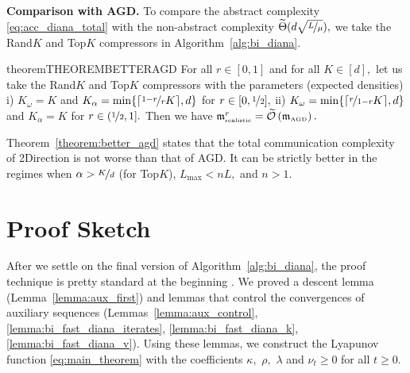 \documentclass{article} %
\newcommand{\cO}{\mathcal{O}}
\theoremstyle{plain}
\theoremstyle{definition}
\theoremstyle{remark}
\newcommand{\green}{\color{mydarkgreen}}
\newcommand{\algname}[1]{{\small\green\sf #1}}
\begin{document}
{\bf Comparison with \algname{AGD}.}
To compare the abstract complexity \eqref{eq:acc_diana_total} with the non-abstract complexity $\widetilde{\Theta}(d \sqrt{\nicefrac{L}{\mu}}),$ we take the Rand$K$ and Top$K$ compressors in Algorithm~\ref{alg:bi_diana}. 

\begin{restatable}{theorem}{THEOREMBETTERAGD}
  \label{theorem:better_agd}
  For all $r \in [0, 1]$ and for all $K \in [d],$ let us take the Rand$K$ and Top$K$ compressors with the parameters (expected densities) i) $K_{\omega} = K$ and $K_{\alpha} = \min\{\lceil\nicefrac{1 - r}{r} K\rceil, d\}$ for $r \in [0, \nicefrac{1}{2}],$ ii) $K_{\omega} = \min\{\lceil\nicefrac{r}{1 - r} K \rceil, d\}$ and $K_{\alpha} = K$ for $r \in (\nicefrac{1}{2}, 1].$  Then we have $\mathfrak{m}^{r}_{{\scriptscriptstyle \textnormal{realistic}}} = \widetilde{\cO}\left(\mathfrak{m}_{{\scriptscriptstyle \textnormal{AGD}}}\right).$
\end{restatable}

Theorem~\ref{theorem:better_agd} states that the total communication complexity of \algname{2Direction} is not worse than that of \algname{AGD}. It can be strictly better in the regimes when $\alpha > \nicefrac{K}{d}$ (for Top$K$), $L_{\max} < n L,$ and $n > 1.$




\section{Proof Sketch}
After we settle on the final version of Algorithm~\ref{alg:bi_diana}, the proof technique is pretty standard at the beginning \citep{ADIANA,tyurin2022dasha,gruntkowska2022ef21}. We proved a descent lemma (Lemma~\ref{lemma:aux_first}) and lemmas that control the convergences of auxiliary sequences (Lemmas~\ref{lemma:aux_control}, \ref{lemma:bi_fast_diana_iterates}, \ref{lemma:bi_fast_diana_k}, \ref{lemma:bi_fast_diana_v}). Using these lemmas, we construct the Lyapunov function \eqref{eq:main_theorem} with the coefficients $\kappa,$ $\rho,$ $\lambda$ and $\nu_{t} \geq 0$ for all $t \geq 0.$
\end{document}

